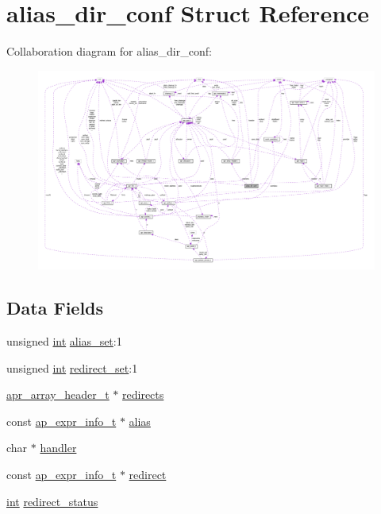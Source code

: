 \hypertarget{structalias__dir__conf}{}\section{alias\+\_\+dir\+\_\+conf Struct Reference}
\label{structalias__dir__conf}


Collaboration diagram for alias\+\_\+dir\+\_\+conf\+:
\nopagebreak
\begin{figure}[H]
\begin{center}
\leavevmode
\includegraphics[width=350pt]{structalias__dir__conf__coll__graph}
\end{center}
\end{figure}
\subsection*{Data Fields}
\begin{DoxyCompactItemize}
\item 
unsigned \hyperlink{pcre_8txt_a42dfa4ff673c82d8efe7144098fbc198}{int} \hyperlink{structalias__dir__conf_a41f9e18a640c5f41ad4d334a5ac570fd}{alias\+\_\+set}\+:1
\item 
unsigned \hyperlink{pcre_8txt_a42dfa4ff673c82d8efe7144098fbc198}{int} \hyperlink{structalias__dir__conf_a39f14fb72a8ab515d9ab7b292de06afb}{redirect\+\_\+set}\+:1
\item 
\hyperlink{structapr__array__header__t}{apr\+\_\+array\+\_\+header\+\_\+t} $\ast$ \hyperlink{structalias__dir__conf_a4fcfde9c70295bbe87adc2664dd620eb}{redirects}
\item 
const \hyperlink{structap__expr__info__t}{ap\+\_\+expr\+\_\+info\+\_\+t} $\ast$ \hyperlink{structalias__dir__conf_a2ce54a24cdd17887166cc4698c2e01a8}{alias}
\item 
char $\ast$ \hyperlink{structalias__dir__conf_a812a976917626b496e40cbeb6ef3a758}{handler}
\item 
const \hyperlink{structap__expr__info__t}{ap\+\_\+expr\+\_\+info\+\_\+t} $\ast$ \hyperlink{structalias__dir__conf_ad6dc65decc1f0c71f7b5ac908ea107c6}{redirect}
\item 
\hyperlink{pcre_8txt_a42dfa4ff673c82d8efe7144098fbc198}{int} \hyperlink{structalias__dir__conf_a454cc81e681925db5ffa105bb95b9890}{redirect\+\_\+status}
\end{DoxyCompactItemize}


